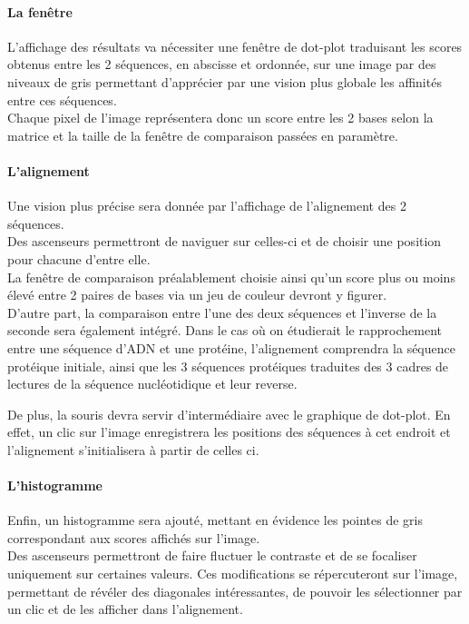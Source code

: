 \documentclass{report}
\begin{document}
\paragraph{La fenêtre}
	L'affichage des résultats va nécessiter une fenêtre de dot-plot traduisant les scores obtenus entre les 2 séquences, en abscisse et ordonnée, sur une image par des niveaux de gris  permettant d'apprécier par une vision plus globale les affinités entre ces séquences.\\
Chaque pixel de l'image représentera donc un score entre les 2 bases selon la matrice et la taille de la fenêtre de comparaison passées en paramètre.



\paragraph{L'alignement}
	Une vision plus précise sera donnée par l'affichage de l'alignement des 2 séquences.\\
Des ascenseurs permettront de naviguer sur celles-ci et de choisir une position pour chacune d'entre elle.\\
La fenêtre de comparaison préalablement choisie ainsi qu'un score plus ou moins élevé entre 2 paires de bases via un jeu de couleur devront y figurer.\\
D'autre part, la comparaison entre l'une des deux séquences et l'inverse de la seconde  sera également intégré.
Dans le cas où on étudierait le rapprochement entre une séquence d'ADN et une protéine, l'alignement comprendra la séquence protéique initiale, ainsi que les 3 séquences protéiques traduites des 3 cadres de lectures de la séquence nucléotidique et leur reverse.



De plus, la souris devra servir d'intermédiaire avec le graphique de dot-plot. En effet, un clic sur l'image enregistrera les positions des séquences à cet endroit et l'alignement s'initialisera à partir de celles ci.


\paragraph{L'histogramme}

Enfin, un histogramme sera ajouté, mettant en évidence les pointes de gris correspondant aux scores affichés sur l'image.\\
Des ascenseurs permettront de faire fluctuer le contraste et de se focaliser uniquement sur certaines valeurs. Ces modifications  se répercuteront sur l'image, permettant de révéler des diagonales intéressantes, de pouvoir les sélectionner par un clic et de les afficher dans l'alignement.
\end{document}
